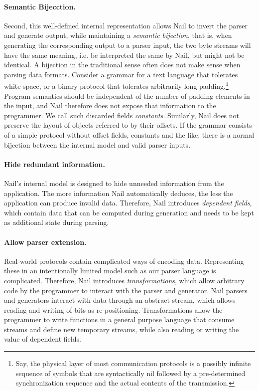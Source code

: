 \noindent

\paragraph{Semantic Bijecction.}
Second, this well-defined internal representation allows Nail to invert the
parser and generate output, while maintaining a \emph{semantic bijection}, that is, when generating
the corresponding output to a parser input, the two byte streams will have the same meaning, i.e. be
interpreted the same by Nail, but might not be identical.
A bijection in the traditional sense often does not make sense when parsing data formats. 
Consider a grammar for a text language that tolerates white space, or a binary protocol that tolerates
arbitrarily long padding.\footnote{Say, the physical layer of most communication
  protocols is a possibly infinite sequence of symbols that are syntactically
  nil followed by a pre-determined synchronization sequence and the actual
  contents of the transmission.} Program semantics should be
independent of the number of padding elements in the input, and Nail therefore
does not expose that information to the programmer. We call such discarded
fields \emph{constants}. 
Similarly, Nail does not preserve the layout of
objects referred to by their offsets. If the grammar consists of a simple protocol without offset
fields, constants and the like, there is a normal bijection between the internal model and valid
parser inputs.
\paragraph{Hide redundant information.}
Nail's internal model is designed to hide unneeded information from the application. The more
information Nail automatically deduces, the less the application can produce invalid data.
Therefore, Nail introduces \emph{dependent fields}, which contain data that can be computed during
generation and needs to be kept as additional state during parsing. 

\paragraph{Allow parser extension.}
Real-world protocols contain complicated ways of encoding data. Representing these in an
intentionally limited model such as our parser language is complicated. Therefore, Nail introduces
\emph{transformations}, which allow arbitrary code by the programmer to interact with the parser and
generator. Nail parsers and generators interact with data through an abstract stream, which allows
reading and writing of bits as re-positioning. Transformations allow the programmer to write
functions in a general purpose language that consume streams and define new temporary streams, while
also reading or writing the value of dependent fields.


